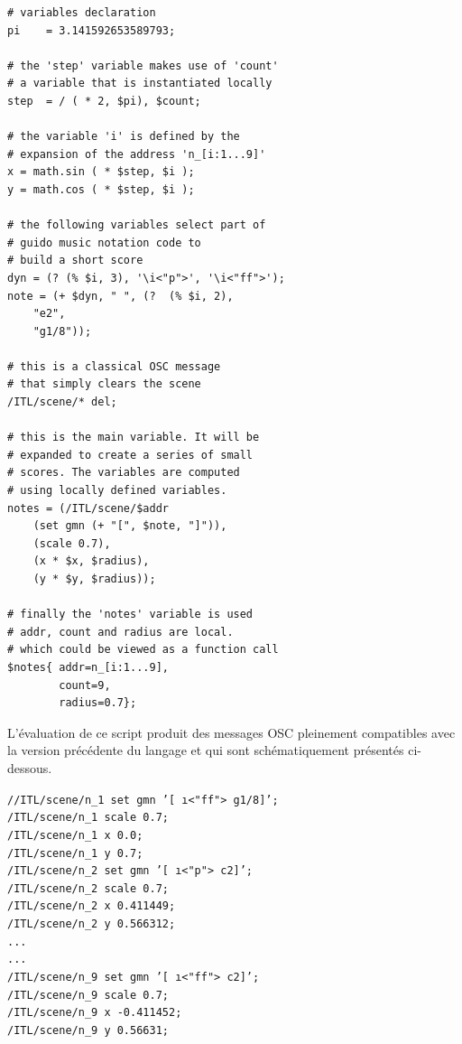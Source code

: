 \documentclass{article}
\newcommand{\code}	[2][0.9]		{\vspace{0mm}\begin{center}\colorbox{mygrey}{
							\begin{minipage}[t]{#1\columnwidth} 
							{\small \texttt{#2}}
							\end{minipage}}\end{center}}
\begin{document}
\begin{lstlisting}[language=inscore, extendedchars=true, basicstyle=\small\ttfamily]
# variables declaration 
pi    = 3.141592653589793;

# the 'step' variable makes use of 'count'
# a variable that is instantiated locally
step  = / ( * 2, $pi), $count;

# the variable 'i' is defined by the 
# expansion of the address 'n_[i:1...9]'
x = math.sin ( * $step, $i );
y = math.cos ( * $step, $i );

# the following variables select part of
# guido music notation code to 
# build a short score
dyn = (? (% $i, 3), '\i<"p">', '\i<"ff">');
note = (+ $dyn, " ", (?  (% $i, 2), 
	"e2", 
	"g1/8"));

# this is a classical OSC message
# that simply clears the scene
/ITL/scene/* del;

# this is the main variable. It will be
# expanded to create a series of small 
# scores. The variables are computed 
# using locally defined variables.  
notes = (/ITL/scene/$addr  
	(set gmn (+ "[", $note, "]")),
	(scale 0.7),
	(x * $x, $radius),
	(y * $y, $radius)); 

# finally the 'notes' variable is used 
# addr, count and radius are local.
# which could be viewed as a function call
$notes{ addr=n_[i:1...9], 
        count=9, 
        radius=0.7};
\end{lstlisting}



L'évaluation de ce script produit des messages OSC pleinement compatibles avec la version précédente du langage et qui sont schématiquement présentés ci-dessous. 
\code[1]{//ITL/scene/n\_1 set gmn '[ \i<"ff"> g1/8]';\\
/ITL/scene/n\_1 scale 0.7;\\
/ITL/scene/n\_1 x 0.0;\\
/ITL/scene/n\_1 y 0.7;\\
/ITL/scene/n\_2 set gmn '[ \i<"p"> c2]';\\
/ITL/scene/n\_2 scale 0.7;\\
/ITL/scene/n\_2 x 0.411449;\\
/ITL/scene/n\_2 y 0.566312;\\
...\\
...\\
/ITL/scene/n\_9 set gmn '[ \i<"ff"> c2]';\\
/ITL/scene/n\_9 scale 0.7;\\
/ITL/scene/n\_9 x -0.411452;\\
/ITL/scene/n\_9 y 0.56631;
}
\end{document}
